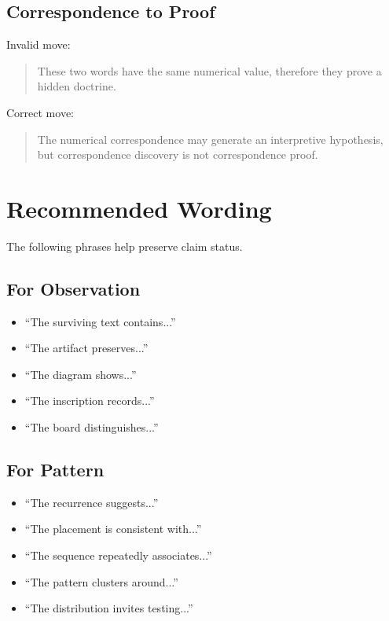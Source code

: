 \documentclass[11pt]{book}
\begin{document}
\subsection{Correspondence to Proof}

Invalid move:

\begin{quote}
These two words have the same numerical value, therefore they prove a hidden doctrine.
\end{quote}

Correct move:

\begin{quote}
The numerical correspondence may generate an interpretive hypothesis, but correspondence discovery is not correspondence proof.
\end{quote}

\section{Recommended Wording}

The following phrases help preserve claim status.

\subsection{For Observation}

\begin{itemize}
    \item ``The surviving text contains...''
    \item ``The artifact preserves...''
    \item ``The diagram shows...''
    \item ``The inscription records...''
    \item ``The board distinguishes...''
\end{itemize}

\subsection{For Pattern}

\begin{itemize}
    \item ``The recurrence suggests...''
    \item ``The placement is consistent with...''
    \item ``The sequence repeatedly associates...''
    \item ``The pattern clusters around...''
    \item ``The distribution invites testing...''
\end{itemize}
\end{document}
